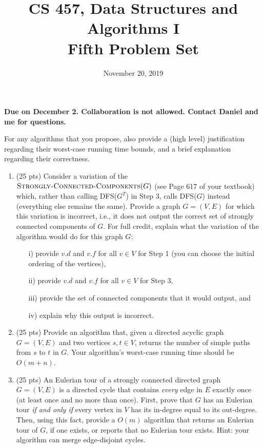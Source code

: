 \documentclass{article}
\begin{document}
\title{CS 457, Data Structures and Algorithms I\\
Fifth Problem Set}
\date{November 20, 2019}
\maketitle
\begin{center}
\textbf{Due on December 2. Collaboration is not allowed. Contact Daniel and me for questions.}
\end{center}

For any algorithms that you propose, also provide a (high level) justification regarding their worst-case running time bounds, and a brief explanation regarding their correctness.
\begin{enumerate}
\item (25 pts) Consider a variation of the $\textsc{Strongly-Connected-Components}(G)$ (see Page 617 of your textbook) which, rather than calling DFS($G^T$) in Step 3, calls DFS($G$) instead (everything else remains the same). Provide a graph $G=(V, E)$ for which this variation is incorrect, i.e., it does not output the correct set of strongly connected components of $G$. For full credit, explain what the variation of the algorithm would do for this graph $G$: 
\begin{itemize}
\item[i)] provide $v.d$ and $v.f$ for all $v\in V$ for Step 1 (you can choose the initial ordering of the vertices),
\item[ii)] provide $v.d$ and $v.f$ for all $v\in V$ for Step 3, 
\item[iii)] provide the set of connected components that it would output, and 
\item[iv)] explain why this output is incorrect.
\end{itemize}

\item (25 pts) Provide an algorithm that, given a directed acyclic graph $G=(V, E)$ and two vertices $s, t\in V$, returns the number of simple paths from $s$ to $t$ in $G$. Your algorithm's worst-case running time should be $O(m +n)$. 


\item (25 pts) An Eulerian tour of a strongly connected directed graph $G=(V, E)$ is a directed cycle that contains {\em every} edge in $E$ exactly once (at least once and no more than once). First, prove that $G$ has an Eulerian tour {\em if and only if} every vertex in $V$ has its in-degree equal to its out-degree. Then, using this fact, provide a $O(m)$ algorithm that returns an Eulerian tour of $G$, if one exists, or reports that no Eulerian tour exists. Hint: your algorithm can merge edge-disjoint cycles.


\end{enumerate}
\end{document}

